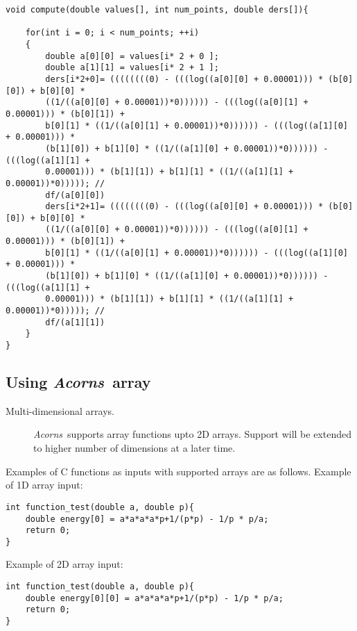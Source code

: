 \documentclass[a4,oneside]{book}
\def\Acorns{\emph{Acorns}}
\begin{document}
\begin{lstlisting}
void compute(double values[], int num_points, double ders[]){

	for(int i = 0; i < num_points; ++i)
	{
		double a[0][0] = values[i* 2 + 0 ];
		double a[1][1] = values[i* 2 + 1 ];
		ders[i*2+0]= ((((((((0) - (((log((a[0][0] + 0.00001))) * (b[0][0]) + b[0][0] *
		((1/((a[0][0] + 0.00001))*0)))))) - (((log((a[0][1] + 0.00001))) * (b[0][1]) +
		b[0][1] * ((1/((a[0][1] + 0.00001))*0)))))) - (((log((a[1][0] + 0.00001))) *
		(b[1][0]) + b[1][0] * ((1/((a[1][0] + 0.00001))*0)))))) - (((log((a[1][1] +
		0.00001))) * (b[1][1]) + b[1][1] * ((1/((a[1][1] + 0.00001))*0))))); //
		df/(a[0][0]) 
		ders[i*2+1]= ((((((((0) - (((log((a[0][0] + 0.00001))) * (b[0][0]) + b[0][0] *
		((1/((a[0][0] + 0.00001))*0)))))) - (((log((a[0][1] + 0.00001))) * (b[0][1]) +
		b[0][1] * ((1/((a[0][1] + 0.00001))*0)))))) - (((log((a[1][0] + 0.00001))) *
		(b[1][0]) + b[1][0] * ((1/((a[1][0] + 0.00001))*0)))))) - (((log((a[1][1] +
		0.00001))) * (b[1][1]) + b[1][1] * ((1/((a[1][1] + 0.00001))*0))))); //
		df/(a[1][1]) 
	}
}

\end{lstlisting}


\subsection{Using \Acorns\ array }
\label{sec:capabilities}


\begin{description}
\item[Multi-dimensional arrays.]  \Acorns\ supports array functions upto 2D arrays. Support will be extended to higher number of dimensions at a later time.

\end{description}%
%  


Examples of C functions as inputs with supported arrays are as follows. Example of 1D array input:

\begin{lstlisting}
int function_test(double a, double p){ 
    double energy[0] = a*a*a*a*p+1/(p*p) - 1/p * p/a; 
    return 0; 
}    
\end{lstlisting}

Example of 2D array input:

\begin{lstlisting}
int function_test(double a, double p){ 
    double energy[0][0] = a*a*a*a*p+1/(p*p) - 1/p * p/a; 
    return 0; 
}    
\end{lstlisting}
\end{document}
